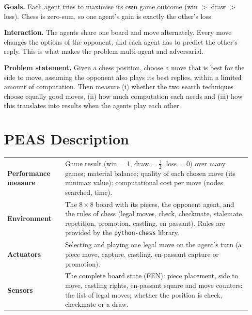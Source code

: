 \documentclass[11pt,a4paper]{article}
\begin{document}
\textbf{Goals.} Each agent tries to maximise its own game outcome (win $>$ draw $>$ loss).
Chess is zero-sum, so one agent's gain is exactly the other's loss.

\textbf{Interaction.} The agents share one board and move alternately. Every move changes the
options of the opponent, and each agent has to predict the other's reply. This is what makes the problem
multi-agent and adversarial.

\textbf{Problem statement.} Given a chess position, choose a move that is best for the side to move,
assuming the opponent also plays its best replies, within a limited amount of computation.
Then measure (i) whether the two search techniques choose equally good moves, (ii) how much
computation each needs and (iii) how this translates into results when the agents play each other.

\section{PEAS Description}
\begin{center}
\begin{tabular}{>{\bfseries}p{3.1cm}p{12.6cm}}
\toprule
Performance measure & Game result (win = 1, draw = $\tfrac12$, loss = 0) over many games; material balance;
quality of each chosen move (its minimax value); computational cost per move (nodes searched, time). \\
Environment & The $8\times8$ board with its pieces, the opponent agent, and the rules of chess
(legal moves, check, checkmate, stalemate, repetition, promotion, castling, en passant). Rules are provided by the
\texttt{python-chess} library. \\
Actuators & Selecting and playing one legal move on the agent's turn (a piece move, capture,
castling, en-passant capture or promotion). \\
Sensors & The complete board state (FEN): piece placement, side to move, castling rights,
en-passant square and move counters; the list of legal moves; whether the position is check, checkmate or a draw. \\
\bottomrule
\end{tabular}
\end{center}

\end{document}
